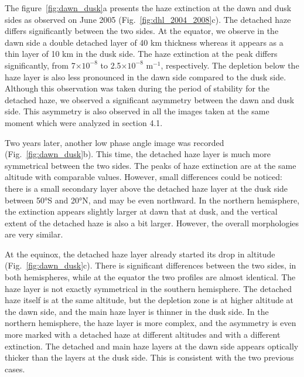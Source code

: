 The figure~\ref{fig:dawn_dusk}a presents the haze extinction at the dawn and dusk sides as observed
on June 2005 (Fig.~\ref{fig:dhl_2004_2008}c). The detached haze differs significantly between the two sides.
At the equator, we observe in the dawn side a double detached layer of 40 km thickness whereas it appears
as a thin layer of 10 km in the dusk side. The haze extinction at the peak differs significantly,
from 7$\times 10^{-8}$ to 2.5$\times 10^{-8}$ m$^{-1}$, respectively. The depletion below the haze layer
is also less pronounced in the dawn side compared to the dusk side. Although this observation was taken
during the period of stability for the detached haze, we observed a significant asymmetry between
the dawn and dusk side. This asymmetry is also observed in all the images taken at the same moment which were
analyzed in section 4.1.

Two years later, another low phase angle image was recorded (Fig.~\ref{fig:dawn_dusk}b).
This time, the detached haze layer is much more symmetrical between the two sides. The peaks of haze extinction
are at the same altitude with comparable values. However, small differences could be noticed: there is a
small secondary layer above the detached haze layer at the dusk side between \ang{50}S and \ang{20}N, and may be even
northward. In the northern hemisphere, the extinction appears slightly larger at dawn that at dusk, and the
vertical extent of the detached haze is also a bit larger. However, the overall morphologies are very similar.

At the equinox, the detached haze layer already started its drop in altitude (Fig.~\ref{fig:dawn_dusk}c).
There is significant differences between the two sides, in both hemispheres, while at the equator the two
profiles are almost identical. The haze layer is not exactly symmetrical in the southern hemisphere. The detached
haze itself is at the same altitude, but the depletion zone is at higher altitude at the dawn side, and the main
haze layer is thinner in the dusk side. In the northern hemisphere, the haze layer is more complex, and the
asymmetry is even more marked with a detached haze at different altitudes and with a different extinction. The
detached and main haze layers at the dawn side appears optically thicker than the layers at the dusk side.
This is consistent with the two previous cases.

